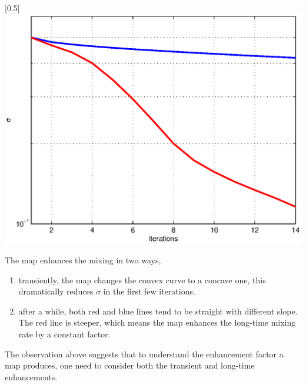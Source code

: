 \begin{example}
\centerline{\scalebox{0.5}[0.5]{\includegraphics{example1.eps} \label{example1}}}

\end{example}

The map enhances the mixing in two ways,
\begin{enumerate}
 \item transiently, the map changes the convex curve to a concave one, this dramatically reduces $\sigma$ in the first few iterations.
 \item after a while, both red and blue lines tend to be straight with different slope. The red line is steeper, which means the map enhances the long-time mixing rate by a constant factor.
\end{enumerate}

The observation above suggests that to understand the enhancement
factor a map produces, one need to consider both the transient and
long-time enhancements.



